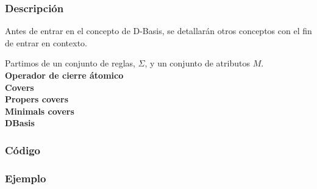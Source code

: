 \subsubsection{Descripci\'on} 
Antes de entrar en el concepto de D-Basis, se detallar\'an otros conceptos con el fin de entrar en contexto.

Partimos de un conjunto de reglas, \( \Sigma \), y un conjunto de atributos \( M \).\\

\textbf{Operador de cierre \'atomico}\\

\textbf{Covers}\\

\textbf{Propers covers} \\

\textbf{Minimals covers}\\

\textbf{DBasis}\\


\newpage 
\subsubsection{C\'odigo} 

\newpage
\subsubsection{Ejemplo} 